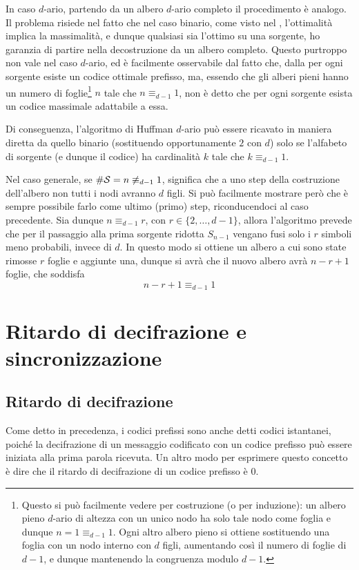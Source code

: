 In caso \(d\)-ario, partendo da un albero \(d\)-ario completo il procedimento è analogo. Il problema risiede nel fatto che nel caso binario, come visto nel , l'ottimalità implica la massimalità, e dunque qualsiasi sia l'ottimo su una sorgente, ho garanzia di partire nella decostruzione da un albero completo.
Questo purtroppo non vale nel caso \(d\)-ario, ed è facilmente osservabile dal fatto che, dalla  per ogni sorgente esiste un codice ottimale prefisso, ma, essendo che gli alberi pieni hanno un numero di foglie\footnote{Questo si può facilmente vedere per costruzione (o per induzione): un albero pieno \(d\)-ario di altezza con un unico nodo ha solo tale nodo come foglia e dunque \(n = 1 \equiv_{d-1} 1\). Ogni altro albero pieno si ottiene sostituendo una foglia con un nodo interno con \(d\) figli, aumentando così il numero di foglie di \(d-1\), e dunque mantenendo la congruenza modulo \(d-1\).}
\(n\) tale che \(n \equiv_{d-1} 1\), non è detto che per ogni sorgente esista un codice massimale adattabile a essa.

Di conseguenza, l'algoritmo di Huffman \(d\)-ario può essere ricavato in maniera diretta da quello binario (sostituendo opportunamente \(2\) con \(d\)) solo se l'alfabeto di sorgente (e dunque il codice) ha cardinalità \(k\) tale che \(k \equiv_{d-1} 1\).

Nel caso generale, se \(\# \mathcal{S} = n \not\equiv_{d-1} 1\), significa che a uno step della costruzione dell'albero non tutti i nodi avranno \(d\) figli.
Si può facilmente mostrare però che è sempre possibile farlo come ultimo (primo) step, riconducendoci al caso precedente.
Sia dunque \(n \equiv_{d-1} r\), con \(r \in \{2, \ldots, d-1\}\), allora l'algoritmo prevede che per il passaggio alla prima sorgente ridotta \(S_{n-1}\) vengano fusi solo i \(r\) simboli
meno probabili, invece di \(d\). In questo modo si ottiene un albero a cui sono state rimosse \(r\) foglie e aggiunte una, dunque si avrà che il nuovo albero avrà \(n - r + 1\) foglie, che soddisfa
\[n - r + 1 \equiv_{d-1} 1\]

\section{Ritardo di decifrazione e sincronizzazione}

\subsection{Ritardo di decifrazione}
Come detto in precedenza, i codici prefissi sono anche detti codici istantanei, poiché
la decifrazione di un messaggio codificato con un codice prefisso può essere iniziata alla prima parola ricevuta.
Un altro modo per esprimere questo concetto è dire che il ritardo di decifrazione di un codice prefisso è \(0\).

